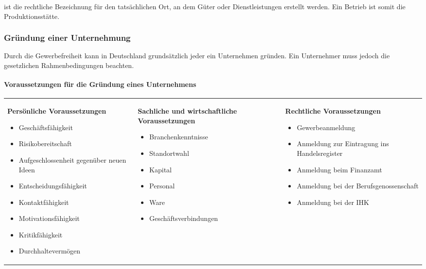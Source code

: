  ist die rechtliche Bezeichnung für den tatsächlichen Ort, an dem Güter oder Dienstleistungen erstellt werden. Ein Betrieb ist somit die Produktionsstätte.

\subsubsection{Gründung einer Unternehmung}
Durch die Gewerbefreiheit kann in Deutschland grundsätzlich jeder ein Unternehmen gründen. Ein Unternehmer muss jedoch die gesetzlichen Rahmenbedingungen beachten.

\paragraph{Voraussetzungen für die Gründung eines Unternehmens}

\begin{table}[!h]
\small
\begin{tabular}{lll}
	\parbox[t]{4.5cm}{
	{\bf Persönliche\\Voraussetzungen}
	\begin{itemize}
		\item Geschäftsfähigkeit
		\item Risikobereitschaft
		\item Aufgeschlossenheit gegenüber neuen Ideen
		\item Entscheidungsfähigkeit
		\item Kontaktfähigkeit
		\item Motivationsfähigkeit
		\item Kritikfähigkeit
		\item Durchhaltevermögen
	\end{itemize}
	} &
	\parbox[t]{5cm}{
	{\bf Sachliche und wirtschaftliche Voraussetzungen}
	\begin{itemize}
		\item Branchenkenntnisse
		\item Standortwahl
		\item Kapital
		\item Personal
		\item Ware
		\item Geschäftsverbindungen
	\end{itemize}
	} &
	\parbox[t]{5cm}{
	{\bf Rechtliche Voraussetzungen}
	\begin{itemize}
		\item Gewerbeanmeldung
		\item Anmeldung zur Eintragung ins Handelsregister
		\item Anmeldung beim Finanzamt
		\item Anmeldung bei der Berufsgenossenschaft
		\item Anmeldung bei der IHK
	\end{itemize}
	}
\end{tabular}
\end{table}

